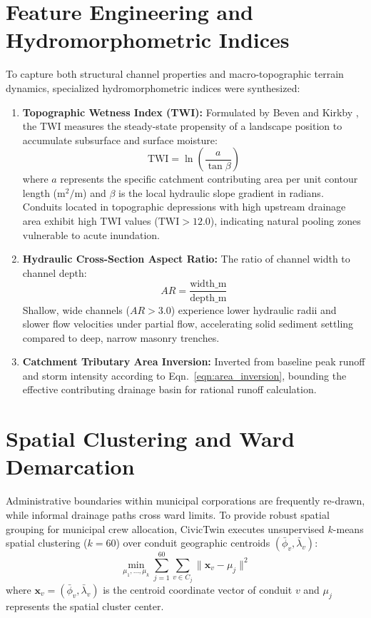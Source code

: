 \section{Feature Engineering and Hydromorphometric Indices}
To capture both structural channel properties and macro-topographic terrain dynamics, specialized hydromorphometric indices were synthesized:
\begin{enumerate}
    \item \textbf{Topographic Wetness Index (TWI):} Formulated by Beven and Kirkby \cite{beven1979physically}, the TWI measures the steady-state propensity of a landscape position to accumulate subsurface and surface moisture:
    \begin{equation}
    \text{TWI} = \ln\left(\frac{a}{\tan \beta}\right)
    \label{eqn:twi_formula}
    \end{equation}
    where $a$ represents the specific catchment contributing area per unit contour length ($\text{m}^2/\text{m}$) and $\beta$ is the local hydraulic slope gradient in radians. Conduits located in topographic depressions with high upstream drainage area exhibit high TWI values ($\text{TWI} > 12.0$), indicating natural pooling zones vulnerable to acute inundation.
    \item \textbf{Hydraulic Cross-Section Aspect Ratio:} The ratio of channel width to channel depth:
    \begin{equation}
    AR = \frac{\text{width\_m}}{\text{depth\_m}}
    \label{eqn:aspect_ratio}
    \end{equation}
    Shallow, wide channels ($AR > 3.0$) experience lower hydraulic radii and slower flow velocities under partial flow, accelerating solid sediment settling compared to deep, narrow masonry trenches.
    \item \textbf{Catchment Tributary Area Inversion:} Inverted from baseline peak runoff and storm intensity according to Eqn.~\ref{eqn:area_inversion}, bounding the effective contributing drainage basin for rational runoff calculation.
\end{enumerate}

\section{Spatial Clustering and Ward Demarcation}
Administrative boundaries within municipal corporations are frequently re-drawn, while informal drainage paths cross ward limits. To provide robust spatial grouping for municipal crew allocation, CivicTwin executes unsupervised $k$-means spatial clustering ($k = 60$) over conduit geographic centroids $(\bar{\phi}_v, \bar{\lambda}_v)$:
\begin{equation}
\min_{\mu_1, \dots, \mu_k} \sum_{j=1}^{60} \sum_{v \in C_j} \|\mathbf{x}_v - \mu_j\|^2
\label{eqn:kmeans_clustering}
\end{equation}
where $\mathbf{x}_v = (\bar{\phi}_v, \bar{\lambda}_v)$ is the centroid coordinate vector of conduit $v$ and $\mu_j$ represents the spatial cluster center. 

